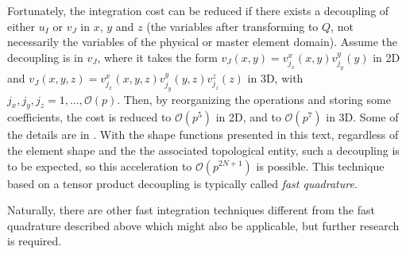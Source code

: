 Fortunately, the integration cost can be reduced if there exists a decoupling of either $u_I$ or $v_J$ in $x$, $y$ and $z$ (the variables after transforming to $Q$, not necessarily the variables of the physical or master element domain). 
Assume the decoupling is in $v_J$, where it takes the form $v_J(x,y)=v_{j_x}^x(x,y)v_{j_y}^y(y)$ in 2D and $v_J(x,y,z)=v_{j_x}^x(x,y,z)v_{j_y}^y(y,z)v_{j_z}^z(z)$ in 3D, with $j_x,j_y,j_z=1,\ldots,\mathcal{O}(p)$. 
Then, by reorganizing the operations and storing some coefficients, the cost is reduced to $\mathcal{O}(p^5)$ in 2D, and to $\mathcal{O}(p^7)$ in 3D.
Some of the details are in \citet{hpbook2}.
With the shape functions presented in this text, regardless of the element shape and the the associated topological entity, such a decoupling is to be expected, so this acceleration to $\mathcal{O}(p^{2N+1})$ is possible.
This technique based on a tensor product decoupling is typically called \textit{fast quadrature}.

Naturally, there are other fast integration techniques different from the fast quadrature described above which might also be applicable, but further research is required.
